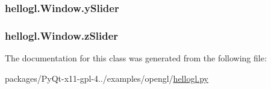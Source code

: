 \subsubsection[{y\+Slider}]{\setlength{\rightskip}{0pt plus 5cm}hellogl.\+Window.\+y\+Slider}\label{classhellogl_1_1Window_af0236f84cd46f7ad37ccdf4ff2289af5}
\hypertarget{classhellogl_1_1Window_a9c33fe83e53f65022a7ff13c6c7f0bd4}{}
\subsubsection[{z\+Slider}]{\setlength{\rightskip}{0pt plus 5cm}hellogl.\+Window.\+z\+Slider}\label{classhellogl_1_1Window_a9c33fe83e53f65022a7ff13c6c7f0bd4}


The documentation for this class was generated from the following file\+:\begin{DoxyCompactItemize}
\item 
packages/\+Py\+Qt-\/x11-\/gpl-\/4../examples/opengl/\hyperlink{hellogl_8py}{hellogl.\+py}\end{DoxyCompactItemize}

